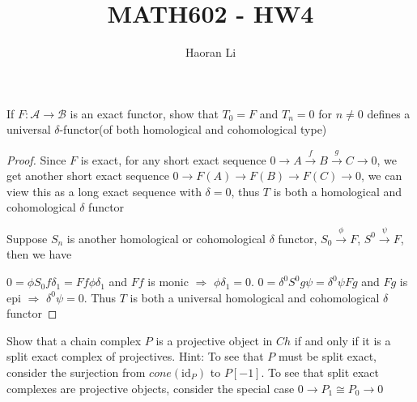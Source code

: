 \documentclass{article}
\title{MATH602 - HW4}
\author{Haoran Li}
\date{}
\newenvironment{exercise}[2][Exercise]{\begin{trivlist}
\item[\hskip \labelsep {\bfseries #1}\hskip \labelsep {\bfseries #2.}]}{\end{trivlist}}
\theoremstyle{definition}
\theoremstyle{remark}
\theoremstyle{definition}
\begin{document}
\sloppy %

\maketitle
\begin{exercise}{\textbf{2.1.2}}
If $F:\mathscr A\to\mathscr B$ is an exact functor, show that $T_0=F$ and $T_n=0$ for $n\neq0$ defines a universal $\delta$-functor(of both homological and cohomological type)
\end{exercise}

\begin{proof}
Since $F$ is exact, for any short exact sequence $0\to A\xrightarrow{f} B\xrightarrow{g} C\to0$, we get another short exact sequence $0\to F(A)\to F(B)\to F(C)\to0$, we can view this as a long exact sequence with $\delta=0$, thus $T$ is both a homological and cohomological $\delta$ functor \par
Suppose $S_n$ is another homological or cohomological $\delta$ functor, $S_0\xrightarrow{\phi}F$, $S^0\xrightarrow{\psi}F$, then we have
\begin{center}
\end{center}
$0=\phi S_0f\delta_1=Ff\phi\delta_1$ and $Ff$ is monic $\Rightarrow$ $\phi\delta_1=0$. $0=\delta^0S^0g\psi=\delta^0\psi Fg$ and $Fg$ is epi $\Rightarrow$ $\delta^0\psi=0$. Thus $T$ is both a universal homological and cohomological $\delta$ functor
\end{proof}

\begin{exercise}{\textbf{2.2.1}}
Show that a chain complex $P$ is a projective object in $Ch$ if and only if it is a split exact complex of projectives. Hint: To see that $P$ must be split exact, consider the surjection from $cone(\mathrm{id}_P)$ to $P[-1]$. To see that split exact complexes are projective objects, consider the special case $0\to P_1\cong P_0\to0$
\end{exercise}
\end{document}
